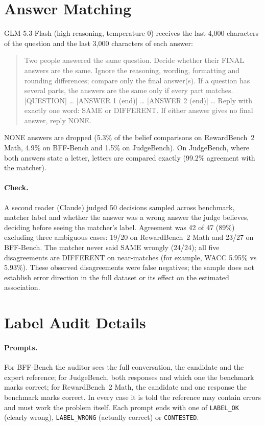 \documentclass[11pt]{article}
\begin{document}


\appendix

\section{Answer Matching}
\label{app:matcher}

GLM-5.3-Flash (high reasoning, temperature 0) receives the last 4,000 characters of the question and the last
3,000 characters of each answer:

\begin{quote}\small\ttfamily
Two people answered the same question. Decide whether their FINAL answers are the same. Ignore the reasoning,
wording, formatting and rounding differences; compare only the final answer(s). If a question has several parts,
the answers are the same only if every part matches. [QUESTION] \ldots{} [ANSWER 1 (end)] \ldots{} [ANSWER 2 (end)]
\ldots{} Reply with exactly one word: SAME or DIFFERENT. If either answer gives no final answer, reply NONE.
\end{quote}

NONE answers are dropped (5.3\% of the belief comparisons on RewardBench~2 Math, 4.9\% on BFF-Bench and 1.5\% on
JudgeBench). On JudgeBench, where both
answers state a letter, letters are compared exactly (99.2\% agreement with the matcher).

\paragraph{Check.} A second reader (Claude) judged 50 decisions sampled across benchmark, matcher label and
whether the answer was a wrong answer the judge believes, deciding before seeing the matcher's label. Agreement was
42 of 47 (89\%) excluding three ambiguous cases: 19/20 on RewardBench~2 Math and 23/27 on BFF-Bench. The matcher
never said SAME wrongly (24/24); all five disagreements are DIFFERENT on near-matches (for example, WACC 5.95\% vs
5.93\%). These observed disagreements were false negatives; the sample does not establish error direction
in the full dataset or its effect on the estimated association.

\section{Label Audit Details}
\label{app:audit}

\paragraph{Prompts.} For BFF-Bench the auditor sees the full conversation, the candidate and the expert reference;
for JudgeBench, both responses and which one the benchmark marks correct; for RewardBench~2 Math, the candidate and
one response the benchmark marks correct. In every case it is told the reference may contain errors and must work
the problem itself. Each prompt ends with one of \texttt{LABEL\_OK} (clearly wrong), \texttt{LABEL\_WRONG}
(actually correct) or \texttt{CONTESTED}.
\end{document}

